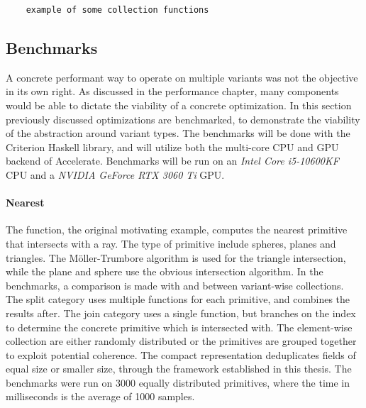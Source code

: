 \documentclass{article}
\newcommand{\type}[1]{\smash{\colorbox{codegray}{\texttt{#1}}}}
\begin{document}
\begin{verbatim}
    example of some collection functions
\end{verbatim}

\newpage

\subsection{Benchmarks}

A concrete performant way to operate on multiple variants was not the objective in its own right.
As discussed in the performance chapter, many components would be able to dictate the viability of a concrete optimization. 
In this section previously discussed optimizations are benchmarked, to demonstrate the viability of the abstraction around variant types.
The benchmarks will be done with the Criterion Haskell library, and will utilize both the multi-core CPU and GPU backend of Accelerate.
Benchmarks will be run on an {\it Intel Core i5-10600KF} CPU and a {\it NVIDIA GeForce RTX 3060 Ti} GPU.

\paragraph{Nearest}

The \type{nearest} function, the original motivating example, computes the nearest primitive that intersects with a ray.
The type of primitive include spheres, planes and triangles.
The Möller-Trumbore algorithm is used for the triangle intersection, while the plane and sphere use the obvious intersection algorithm.
In the benchmarks, a comparison is made with and between variant-wise collections.
The split category uses multiple functions for each primitive, and combines the results after.
The join category uses a single function, but branches on the index to determine the concrete primitive which is intersected with.
The element-wise collection are either randomly distributed or the primitives are grouped together to exploit potential coherence.
The compact representation deduplicates fields of equal size or smaller size, through the framework established in this thesis.
The benchmarks were run on 3000 equally distributed primitives, where the time in milliseconds is the average of 1000 samples.
\end{document}
